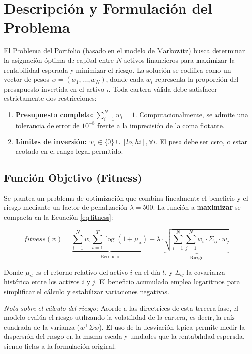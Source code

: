 \section{Descripción y Formulación del Problema}
\label{sec:formulacion}

El Problema del Portfolio (basado en el modelo de Markowitz) busca determinar la asignación óptima de capital entre $N$ activos financieros para maximizar la rentabilidad esperada y minimizar el riesgo. La solución se codifica como un vector de pesos $w = (w_1, \dots, w_N)$, donde cada $w_i$ representa la proporción del presupuesto invertida en el activo $i$. Toda cartera válida debe satisfacer estrictamente dos restricciones:
\begin{enumerate}[noitemsep]
    \item \textbf{Presupuesto completo:} $\sum_{i=1}^{N} w_i = 1$. Computacionalmente, se admite una tolerancia de error de $10^{-8}$ frente a la imprecisión de la coma flotante.
    \item \textbf{Límites de inversión:} $w_i \in \{0\} \cup [lo, hi], \forall i$. El peso debe ser cero, o estar acotado en el rango legal permitido.
\end{enumerate}

\subsection{Función Objetivo (Fitness)}
Se plantea un problema de optimización que combina linealmente el beneficio y el riesgo mediante un factor de penalización $\lambda = 500$. La función a \textbf{maximizar} se compacta en la Ecuación \ref{eq:fitness}:

\begin{equation}
    fitness(w) = \underbrace{\sum_{i=1}^{N} w_i \sum_{t=1}^{T} \log(1+\mu_{it})}_{\text{Beneficio}} - \lambda \cdot \underbrace{\sqrt{\sum_{i=1}^{N} \sum_{j=1}^{N} w_i \cdot \Sigma_{ij} \cdot w_j}}_{\text{Riesgo}}
    \label{eq:fitness}
\end{equation}

Donde $\mu_{it}$ es el retorno relativo del activo $i$ en el día $t$, y $\Sigma_{ij}$ la covarianza histórica entre los activos $i$ y $j$. El beneficio acumulado emplea logaritmos para simplificar el cálculo y estabilizar variaciones negativas.

\textit{Nota sobre el cálculo del riesgo:} Acorde a las directrices de esta tercera fase, el modelo evalúa el riesgo utilizando la volatilidad de la cartera, es decir, la raíz cuadrada de la varianza ($w^\top \Sigma w$). El uso de la desviación típica permite medir la dispersión del riesgo en la misma escala y unidades que la rentabilidad esperada, siendo fieles a la formulación original.

